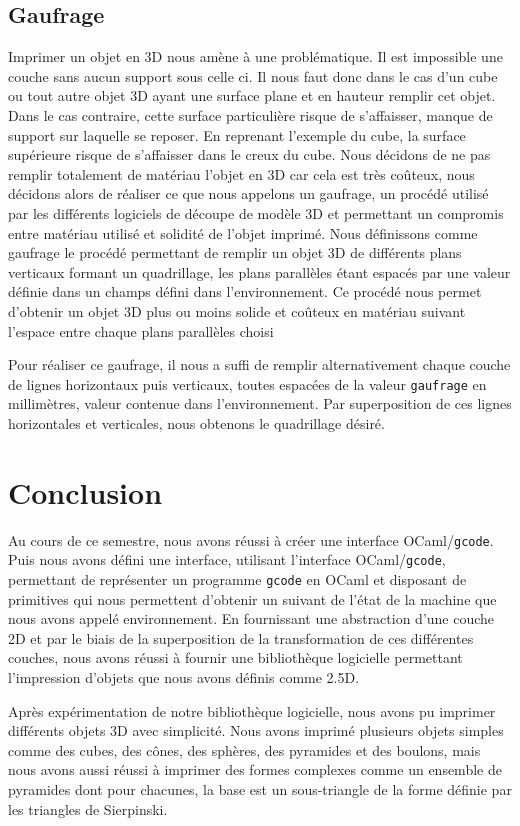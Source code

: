 \documentclass[11pt, titlepage]{article}
\begin{document}
\subsection{Gaufrage}
Imprimer un objet en 3D nous amène à une problématique. Il est impossible une couche sans aucun support sous celle ci. Il nous faut donc dans le cas d'un cube ou tout autre objet 3D ayant une surface plane et en hauteur remplir cet objet. Dans le cas contraire, cette surface particulière risque de s'affaisser, manque de support sur laquelle se reposer. En reprenant l'exemple du cube, la surface supérieure risque de s'affaisser dans le creux du cube.
Nous décidons de ne pas remplir totalement de matériau l'objet en 3D car cela est très coûteux, nous décidons alors de réaliser ce que nous appelons un gaufrage, un procédé utilisé par les différents logiciels de découpe de modèle 3D et permettant un compromis entre matériau utilisé et solidité de l'objet imprimé.
Nous définissons comme gaufrage le procédé permettant de remplir un objet 3D de différents plans verticaux formant un quadrillage, les plans parallèles étant espacés par une valeur définie dans un champs défini dans l'environnement. Ce procédé nous permet d'obtenir un objet 3D plus ou moins solide et coûteux en matériau suivant l'espace entre chaque plans parallèles choisi

Pour réaliser ce gaufrage, il nous a suffi de remplir alternativement chaque couche de lignes horizontaux puis verticaux, toutes espacées de la valeur \verb&gaufrage& en millimètres, valeur contenue dans l'environnement. 
Par superposition de ces lignes horizontales et verticales, nous obtenons le quadrillage désiré.

\newpage
\section{Conclusion}
Au cours de ce semestre, nous avons réussi à créer une interface OCaml/\verb&gcode&. Puis nous avons défini une interface, utilisant l'interface OCaml/\verb&gcode&, permettant de représenter un programme \verb&gcode& en OCaml et disposant de primitives qui nous permettent d'obtenir un suivant de l'état de la machine que nous avons appelé environnement. En fournissant une abstraction d'une couche 2D et par le biais de la superposition de la transformation de ces différentes couches, nous avons réussi à fournir une bibliothèque logicielle permettant l'impression d'objets que nous avons définis comme 2.5D.

Après expérimentation de notre bibliothèque logicielle, nous avons pu imprimer différents objets 3D avec simplicité. Nous avons imprimé plusieurs objets simples comme des cubes, des cônes, des sphères, des pyramides et des boulons, mais nous avons aussi réussi à imprimer des formes complexes comme un ensemble de pyramides dont pour chacunes, la base est un sous-triangle de la forme définie par les triangles de Sierpinski.
\end{document}
